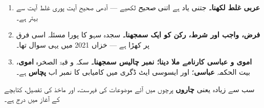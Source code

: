 \begin{enumerate}\setlength{\itemsep}{3pt}
  \item \textbf{عربی غلط لکھنا۔} جتنی یاد ہے اتنی \emph{صحیح} لکھیے --- آدھی
        صحیح آیت پوری غلط آیت سے بہتر ہے۔
  \item \textbf{فرض، واجب اور شرط، رکن کو ایک سمجھنا۔} سجدہ سہو کا پورا مسئلہ
        اسی فرق پر کھڑا ہے --- خزاں \textenglish{2021} میں یہی سوال تھا۔
  \item \textbf{اموی و عباسی کارنامے ملا دینا؛ نمبر چالیس سمجھنا۔} سکہ و قبۃ
        الصخرہ \textbf{اموی}، بیت الحکمہ \textbf{عباسی}؛ اور ایسوسی ایٹ ڈگری
        میں کامیابی کا نمبر اب \textbf{پچاس} ہے۔
\end{enumerate}

\enlargethispage{2\baselineskip}
\smallskip
\noindent
سب سے زیادہ یعنی \textbf{چاروں} پرچوں میں آئے موضوعات کی فہرست، اور ماخذ کی
تفصیل، کتابچے کے آغاز میں درج ہے۔
